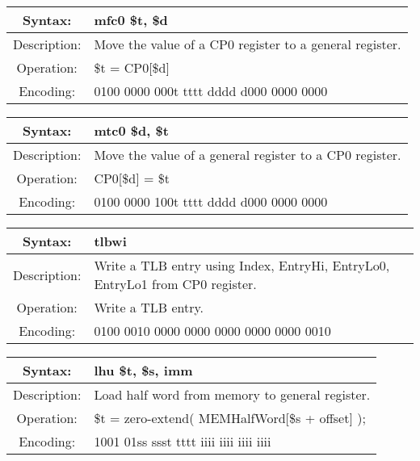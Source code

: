     \begin{table}[!hbp]
    \begin{tabularx}{\textwidth}{|c|X|}
        \hline
        Syntax: & mfc0 \$t, \$d \\
        \hline
        Description: & Move the value of a CP0 register to a general register. \\
        \hline
        Operation: & \$t = CP0[\$d] \\
        \hline
        Encoding: & 0100 0000 000t tttt dddd d000 0000 0000 \\
        \hline
    \end{tabularx}
    \end{table}

    \begin{table}[!hbp]
    \begin{tabularx}{\textwidth}{|c|X|}
        \hline
        Syntax: & mtc0 \$d, \$t \\
        \hline
        Description: & Move the value of a general register to a CP0 register. \\
        \hline
        Operation: & CP0[\$d] = \$t \\
        \hline
        Encoding: & 0100 0000 100t tttt dddd d000 0000 0000 \\
        \hline
    \end{tabularx}
    \end{table}

    \begin{table}[!hbp]
    \begin{tabularx}{\textwidth}{|c|X|}
        \hline
        Syntax: & tlbwi \\
        \hline
        Description: & Write a TLB entry using Index, EntryHi, EntryLo0, EntryLo1 from CP0 register. \\
        \hline
        Operation: & Write a TLB entry. \\
        \hline
        Encoding: & 0100 0010 0000 0000 0000 0000 0000 0010 \\
        \hline
    \end{tabularx}
    \end{table}

    
    \begin{table}[!hbp]
    \begin{tabularx}{\textwidth}{|c|X|}
        \hline
        Syntax: & lhu \$t, \$s, imm \\
        \hline
        Description: & Load half word from memory to general register. \\
        \hline
        Operation: & \$t = zero-extend( MEMHalfWord[\$s + offset] ); \\
        \hline
        Encoding: & 1001 01ss ssst tttt iiii iiii iiii iiii \\
        \hline
    \end{tabularx}
    \end{table}

    